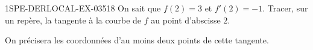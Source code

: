 \begin{exercice}{1SPE-DERLOCAL-EX-035}{1}{8}
On sait que $f(2)=3$ et $f'(2)=-1$. Tracer, sur un repère, la tangente à la courbe de $f$ au point d'abscisse $2$.

On précisera les coordonnées d'au moins deux points de cette tangente.
\end{exercice}
